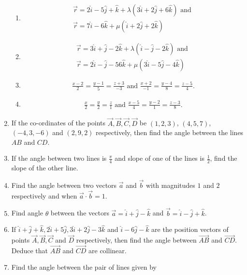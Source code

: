 \begin{enumerate}[label=\thesubsection.\arabic*, ref=\thesubsection.\theenumi]
\begin{enumerate}	
\item  
\begin{align}
\overrightarrow{r}=2\hat{i}-5\hat{j}+\hat{k}+\lambda(3\hat{i}+2\hat{j}+6\hat{k}) \text{ and }\\ \overrightarrow{r}=7\hat{i}-6\hat{k}+\mu(\hat{i}+2\hat{j}+2\hat{k}) 
\end{align} 
\item 
\begin{align}
\overrightarrow{r}=3\hat{i}+\hat{j}-2\hat{k}+\lambda(\hat{i}-\hat{j}-2\hat{k}) \text{ and }\\ \overrightarrow{r}=2\hat{i}-\hat{j}-56\hat{k}+\mu(3\hat{i}-5\hat{j}-4\hat{k})
\end{align}
\item 
\begin{align} \frac{x-2}{2}=\frac{y-1}{5}=\frac{z+3}{-3}\text{ and } \frac{x+2}{-1}=\frac{y-4}{8}=\frac{z-5}{4}.
\end{align}
\item
\begin{align} \frac{x}{2}=\frac{y}{2}=\frac{z}{1}\text{ and } \frac{x-5}{4}=\frac{y-2}{1}=\frac{z-3}{8}.
\end{align}
\end{enumerate}
\item If the co-ordinates of the points $\vec{A}, \vec{B}, \vec{C}, \vec{D}$ be $(1, 2, 3)$,  $(4, 5, 7)$,  $(-4, 3, -6)$ and $(2, 9, 2)$ respectively,  then find the angle between the lines $AB$ and $CD$.
\item If the angle between two lines is $\frac{\pi}{4}$ and slope of one of the lines is $\frac{1}{2}$, find the slope of the other line.
\item Find the angle between two vectors $\overrightarrow{a}$ and $\overrightarrow{b}$ with magnitudes $1$ and $2$ respectively and when $\overrightarrow{a}\cdot \overrightarrow{b} = 1$.
\item Find angle $\theta$ between the vectors $\overrightarrow{a} = \hat{i} +\hat{j} -\hat{k}$ and $\overrightarrow{b} = \hat{i} -\hat{j}+\hat{k}$.
\item If $\hat{i}+\hat{j}+\hat{k}, 2\hat{i}+5\hat{j}, 3\hat{i}+2\hat{j}-3\hat{k}$ and $\hat{i}-6\hat{j}-\hat{k}$ are the position vectors of points $\vec{A}, \vec{B}, \vec{C}$ and $\vec{D}$ respectively, then find the angle between $\overrightarrow{AB}$ and $\overrightarrow{CD}$. Deduce that $\overrightarrow{AB}$ and $\overrightarrow{CD}$ are collinear.
\item Find the angle between the pair of lines given by

\end{enumerate}
